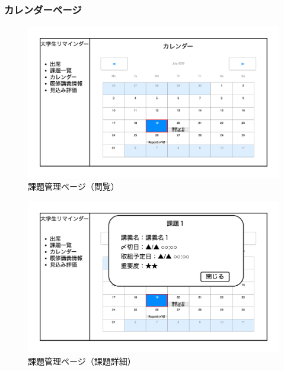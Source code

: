 \documentclass[a4paper, 11pt, titlepage]{jsarticle}
\begin{document}
\subsubsection{カレンダーページ}
\begin{figure}[htbp]
\begin{center}
\includegraphics[width=120mm]{../img/Calendar1.png}
\caption{課題管理ページ（閲覧）}
\end{center}
\end{figure}
\begin{figure}[htbp]
\begin{center}
\includegraphics[width=120mm]{../img/Calendar2.png}
\caption{課題管理ページ（課題詳細）}
\end{center}
\end{figure}

\clearpage
\end{document}
